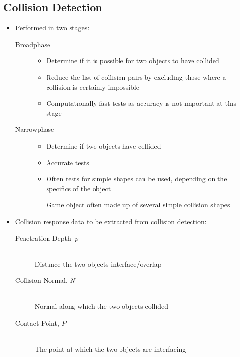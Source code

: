 \documentclass[a4paper]{article}
\begin{document}
\subsection{Collision Detection}

\begin{itemize}
  \item
    Performed in two stages:
    \begin{description}
      \item[Broadphase] \hfill
        \begin{itemize}
          \item
            Determine if it is possible for two objects to have collided

          \item
            Reduce the list of collision pairs by excluding those where a
            collision is certainly impossible

          \item
            Computationally fast tests as accuracy is not important at this
            stage

        \end{itemize}

      \item[Narrowphase] \hfill
        \begin{itemize}
          \item
            Determine if two objects have collided

          \item
            Accurate tests

          \item
            Often tests for simple shapes can be used, depending on the
            specifics of the object

            Game object often made up of several simple collision shapes

        \end{itemize}

    \end{description}

  \item
    Collision response data to be extracted from collision detection:
    \begin{description}
      \item[Penetration Depth, $p$] \hfill \\
        Distance the two objects interface/overlap

      \item[Collision Normal, $N$] \hfill \\
        Normal along which the two objects collided

      \item[Contact Point, $P$] \hfill \\
        The point at which the two objects are interfacing

    \end{description}

\end{itemize}
\end{document}
